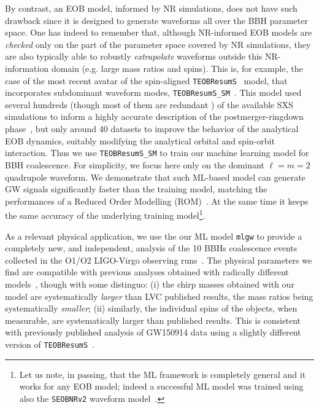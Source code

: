 By contrast, an EOB model, informed by NR simulations, does not have such drawback 
since it is designed to generate waveforms all over the BBH parameter space. 
One has indeed to remember that, although NR-informed EOB models are {\it checked} 
only on the part of the parameter space covered by NR simulations, 
they are also typically able to robustly {\it extrapolate} waveforms 
outside this NR-information domain (e.g. large mass ratios and
spins).
%
%
This is, for example, the case of the most  recent avatar of 
the spin-aligned \texttt{TEOBResumS}~\cite{Nagar:2018zoe} model, 
that incorporates subdominant waveform modes,  \texttt{TEOBResumS\_SM}~\cite{Nagar:2019wds,Nagar:2020pcj}. 
This model used several hundreds (though most of them are
redundant
%
) 
%
of the available SXS simulations to inform a highly accurate description 
of the postmerger-ringdown phase~\cite{Damour:2014yha}, but 
only around 40 datasets to improve the behavior of the analytical EOB dynamics, 
suitably modifying the analytical orbital and spin-orbit interaction.
Thus we use \texttt{TEOBResumS\_SM} to train our machine learning 
model for BBH coalescence. For simplicity, we focus here only on the 
dominant $\ell=m=2$ quadrupole waveform. 
We demonstrate that such ML-based model can generate 
GW signals significantly faster than the training model, 
matching the performances of a Reduced Order Modelling 
(ROM)~\cite{Purrer:2015tud,Bohe:2016gbl,Purrer:2017str}.  
At the same time it keeps the same accuracy of the underlying 
training model\footnote{Let us note, in passing, that the ML framework 
is completely general and it works for any EOB model; indeed 
a successful ML model was trained using also the \texttt{SEOBNRv2} 
waveform model~\cite{Taracchini:2013rva}.}.

As a relevant physical application, we use the our ML model \texttt{mlgw} 
to provide a completely new, and independent, analysis of the 10 BBHs 
coalescence events collected in the O1/O2 LIGO-Virgo observing 
runs~\cite{LIGOScientific:2018mvr}. The physical parameters we find are 
compatible with previous analyses obtained with radically different 
models~\cite{LIGOScientific:2018mvr}, though with some
distinguo:
%
%
(i) the chirp masses obtained with our model are systematically {\it larger} 
than LVC published results, the mass ratios being systematically {\it smaller}; 
(ii) similarly, the individual spins of the objects, when measurable, are systematically larger than published
results. This is consistent with previously published analysis of GW150914 
data using a slightly different version of \texttt{TEOBResumS}~\cite{Nagar:2018zoe}.

